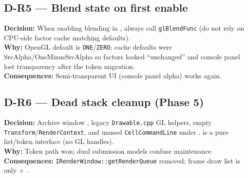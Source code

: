 \subsection*{D-R5 --- Blend state on first enable}
\begin{decisionbox}[title={D-R5 \quad 2026-07-28}]
\textbf{Decision:} When enabling blending in ,
always call \texttt{glBlendFunc} (do not rely on CPU-side factor cache matching
defaults).\\
\textbf{Why:} OpenGL default is \texttt{ONE}/\texttt{ZERO}; cache defaults were
SrcAlpha/OneMinusSrcAlpha so factors looked ``unchanged'' and console panel
lost transparency after the token migration.\\
\textbf{Consequences:} Semi-transparent UI (console panel alpha) works again.
\end{decisionbox}

\subsection*{D-R6 --- Dead stack cleanup (Phase 5)}
\begin{decisionbox}[title={D-R6 \quad 2026-07-28}]
\textbf{Decision:} Archive window , legacy
\texttt{Drawable.cpp} GL helpers, empty \texttt{Transform}/\texttt{RenderContext},
and unused \texttt{CellCommandLine} under .
 is a pure list/token interface (no GL handles).\\
\textbf{Why:} Token path won; dual submission models confuse maintenance.\\
\textbf{Consequences:} \texttt{IRenderWindow::getRenderQueue} removed; frame
draw list is only  + .
\end{decisionbox}

